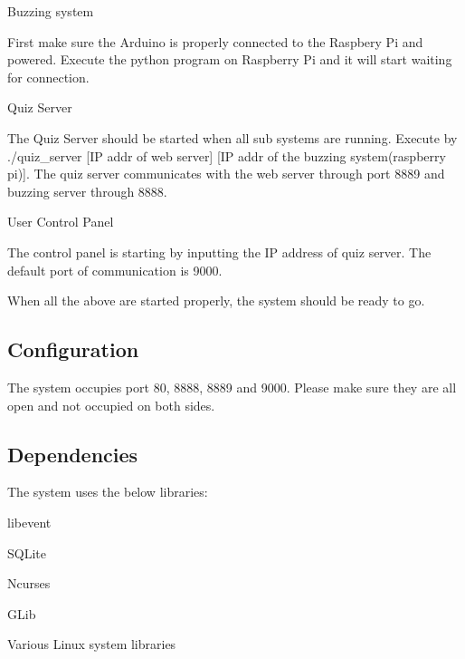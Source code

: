 \begin{DoxyEnumerate}
\item Buzzing system
\end{DoxyEnumerate}

First make sure the Arduino is properly connected to the Raspbery Pi and powered. Execute the python program on Raspberry Pi and it will start waiting for connection.


\begin{DoxyEnumerate}
\item Quiz Server
\end{DoxyEnumerate}

The Quiz Server should be started when all sub systems are running. Execute by ./quiz\+\_\+server \mbox{[}I\+P addr of web server\mbox{]} \mbox{[}I\+P addr of the buzzing system(raspberry pi)\mbox{]}. The quiz server communicates with the web server through port 8889 and buzzing server through 8888.


\begin{DoxyEnumerate}
\item User Control Panel
\end{DoxyEnumerate}

The control panel is starting by inputting the I\+P address of quiz server. The default port of communication is 9000.

When all the above are started properly, the system should be ready to go.

\subsection*{Configuration}

The system occupies port 80, 8888, 8889 and 9000. Please make sure they are all open and not occupied on both sides.

\subsection*{Dependencies}

The system uses the below libraries\+:


\begin{DoxyItemize}
\item libevent
\item S\+Q\+Lite
\item Ncurses
\item G\+Lib
\item Various Linux system libraries
\end{DoxyItemize}


